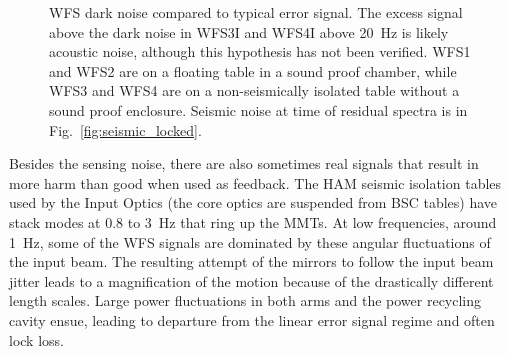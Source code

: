 \begin{figure}
\begin{centering}
\caption[WFS error signal and dark noise]{WFS dark noise compared to typical error signal. The excess signal above the dark noise in WFS3I and WFS4I above 20~Hz is likely acoustic noise, although this hypothesis has not been verified. WFS1 and WFS2 are on a floating table in a sound proof chamber, while WFS3 and WFS4 are on a non-seismically isolated table without a sound proof enclosure. Seismic noise at time of residual spectra is in Fig.~\ref{fig:seismic_locked}.}
\label{fig:WFSdarknoise}
\end{centering}
\end{figure}

Besides the sensing noise, there are also sometimes real signals that result in more harm than good when used as feedback. The HAM seismic isolation tables used by the Input Optics (the core optics are suspended from BSC tables) have stack modes at 0.8 to 3~Hz that ring up the MMTs.  At low frequencies, around 1~Hz, some of the WFS signals are dominated by these angular fluctuations of the input beam. The resulting attempt of the mirrors to follow the input beam jitter leads to a magnification of the motion because of the drastically different length scales. Large power fluctuations in both arms and the power recycling cavity ensue, leading to departure from the linear error signal regime and often lock loss. 

